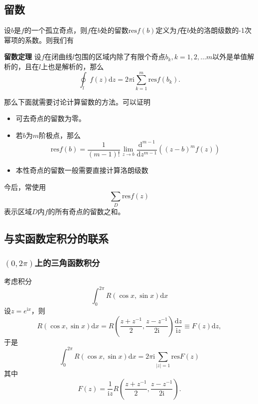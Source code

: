 \hypertarget{ux7559ux6570}{%
\subsection{留数}\label{ux7559ux6570}}

设\(b\)是\(f\)的一个孤立奇点，则\(f\)在\(b\)处的留数\(\mathrm{res}f (b)\)定义为\(f\)在\(b\)处的洛朗级数的-1次幂项的系数。则我们有

\textbf{留数定理}
设\(f\)在闭曲线\(l\)包围的区域内除了有限个奇点\(b_k, k=1, 2, \ldots m\)以外是单值解析的，且在\(l\)上也是解析的，那么
\[
\oint_l f(z) \mathrm{d}z = 2 \pi \mathrm{i} \sum_{k=1}^m \mathrm{res} f(b_k).
\]

那么下面就需要讨论计算留数的方法。可以证明

\begin{itemize}
\tightlist
\item
  可去奇点的留数为零。
\item
  若\(b\)为\(m\)阶极点，那么 \[
  \mathrm{res} f(b) = \frac{1}{(m-1)!} \lim_{z \to b} \frac{\mathrm{d}^{m-1}}{\mathrm{d} z^{m-1}} \left( (z-b)^m f(z) \right)
  \]
\item
  本性奇点的留数一般需要直接计算洛朗级数
\end{itemize}

今后，常使用 \[
\sum_D \mathrm{res} f(z)
\] 表示区域\(D\)内\(f\)的所有奇点的留数之和。

\hypertarget{ux4e0eux5b9eux51fdux6570ux5b9aux79efux5206ux7684ux8054ux7cfb}{%
\subsection{与实函数定积分的联系}\label{ux4e0eux5b9eux51fdux6570ux5b9aux79efux5206ux7684ux8054ux7cfb}}

\hypertarget{piux4e0aux7684ux4e09ux89d2ux51fdux6570ux79efux5206}{%
\subsubsection{\texorpdfstring{\((0, 2\pi)\)上的三角函数积分}{(0, 2\textbackslash{}pi)上的三角函数积分}}\label{piux4e0aux7684ux4e09ux89d2ux51fdux6570ux79efux5206}}

考虑积分 \[
\int_0^{2\pi} R(\cos x, \sin x) \mathrm{d}x
\] 设\(z=e^{\mathrm{i}x}\)，则 \[
R(\cos x, \sin x) \mathrm{d}x = R \left(\frac{z + z^{-1}}{2}, \frac{z - z^{-1}}{2 \mathrm{i}}\right) \frac{\mathrm{d} z}{\mathrm{i}z} \equiv F(z) \mathrm{d}z,
\] 于是 \[
\int_0^{2\pi} R(\cos x, \sin x) \mathrm{d}x = 2 \pi \mathrm{i} \sum_{|z|=1} \mathrm{res} F(z)
\] 其中 \[
F(z) = \frac{1}{\mathrm{i}z} R \left(\frac{z + z^{-1}}{2}, \frac{z - z^{-1}}{2 \mathrm{i}}\right).
\]

